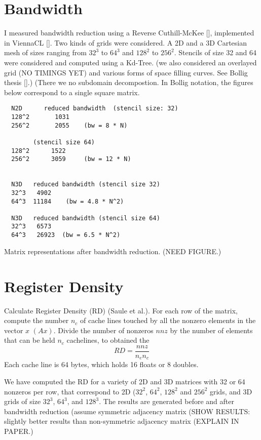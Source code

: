 \section{Bandwidth}
I measured bandwidth reduction using a Reverse Cuthill-McKee [], implemented 
in ViennaCL []. Two kinds of grids were considered. A 2D and a 3D Cartesian mesh of sizes ranging from $32^3$ to $64^3$ and $128^2$ to $256^2$. 
Stencils of size 32 and 64 were considered and computed using a Kd-Tree. 
(we also considered an overlayed grid (NO TIMINGS YET) and various forms of space filling curves. See Bollig thesis [].)  (There we no subdomain decompostion. In Bollig notation, the figures below correspond to a single 
square matrix. 

\begin{verbatim}
  N2D      reduced bandwidth  (stencil size: 32)
  128^2       1031
  256^2       2055    (bw = 8 * N)

        (stencil size 64)
  128^2      1522
  256^2      3059     (bw = 12 * N)


  N3D   reduced bandwidth (stencil size 32)
  32^3   4902
  64^3  11184    (bw = 4.8 * N^2)

  N3D   reduced bandwidth (stencil size 64) 
  32^3   6573   
  64^3   26923  (bw = 6.5 * N^2)
\end{verbatim}

Matrix representations after bandwidth reduction. (NEED FIGURE.)

\section{Register Density}
Calculate Register Density (RD) (Saule et al.). For each row of the  matrix, compute the number $n_c$ of cache lines touched by all the nonzero elements in the vector $x$ $(Ax)$. Divide the number of nonzeros $nnz$ by the number of elements that can be held $n_c$  cachelines, to obtained the 
$$
   RD = \frac{nnz}{n_e n_c}
$$
Each cache line is 64 bytes, which holds 16 floats or 8 doubles. 

We have computed the RD for a variety of 2D and 3D matrices with 32 or 64 nonzeros per row, that correspond to 2D ($32^2$, $64^2$, $128^2$ and $256^2$ grids, and 3D grids of size $32^3$, $64^3$, and $128^3$. The results are generated before and after bandwidth reduction (assume symmetric adjacency matrix (SHOW RESULTS: slightly better results than non-symmetric adjacency matrix (EXPLAIN IN PAPER.)

\begin{verbatim}
\end{verbatim}
